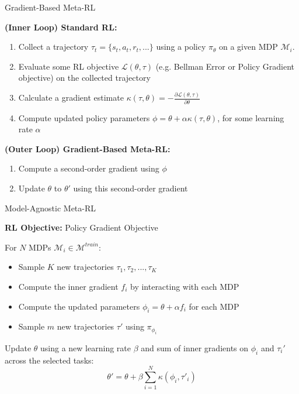 \documentclass[aspectratio=169]{../latex_main/tntbeamer}  %
\begin{document}
\begin{frame}{Gradient-Based Meta-RL}
    
    \textbf{(Inner Loop) Standard RL:} 
    \begin{enumerate}
        \item Collect a trajectory $\tau_t = \{s_t, a_t, r_{t}, ...\}$ using a policy $\pi_\theta$ on a given MDP $\mathcal{M}_i$.
        \item Evaluate some RL objective $\mathcal{L}(\theta, \tau)$ (e.g. Bellman Error or Policy Gradient objective) on the collected trajectory
        \item Calculate a gradient estimate $\kappa(\tau, \theta) = - \frac{\partial \mathcal{L}(\theta, \tau)}{\partial \theta}$
        \item Compute updated policy parameters  $\phi = \theta +  \alpha \kappa(\tau, \theta)$, for some learning rate $\alpha$
    \end{enumerate}

    \pause
    \vfill
    \textbf{(Outer Loop) Gradient-Based Meta-RL:} 
    \begin{enumerate}
        \item Compute a second-order gradient using $\phi$
        \item Update $\theta$ to $\theta'$ using this second-order gradient
    \end{enumerate} 

\end{frame}

\begin{frame}{Model-Agnostic Meta-RL~}
    
    \textbf{RL Objective:} Policy Gradient Objective 
    

    \vfill 
    For $N$ MDPs $\mathcal{M}_i \in \mathcal{M}^{train}$:
    \begin{itemize}
        \item Sample $K$ new trajectories $\tau_1, \tau_2, ..., \tau_K$
        \item Compute the inner gradient $f_i$ by interacting with each MDP 
        \item Compute the updated parameters $\phi_i = \theta +  \alpha f_i$ for each MDP
        \item Sample $m$ new trajectories $\tau'$ using $\pi_{\phi_i}$
    \end{itemize}

    \vfill
    Update $\theta$ using a new learning rate $\beta$ and sum of inner gradients on $\phi_i$ and $\tau_i'$ across the selected tasks:
    \[
        \theta' = \theta + \beta \sum_{i=1}^{N} \kappa(\phi_i, \tau'_i)  
    \]
    
    
\end{frame}
\end{document}
